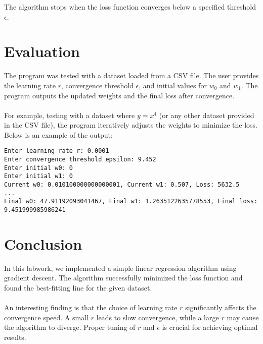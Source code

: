 \documentclass{article}
\begin{document}
The algorithm stops when the loss function converges below a specified threshold $\epsilon$.

\section{Evaluation}

The program was tested with a dataset loaded from a CSV file. The user provides the learning rate $r$, 
convergence threshold $\epsilon$, and initial values for $w_0$ and $w_1$. The program outputs the 
updated weights and the final loss after convergence.\\
\\
For example, testing with a dataset where $y = x^4$ (or any other dataset provided in the CSV file), 
the program iteratively adjusts the weights to minimize the loss. Below is an example of the output:

\begin{verbatim}
Enter learning rate r: 0.0001
Enter convergence threshold epsilon: 9.452
Enter initial w0: 0
Enter initial w1: 0
Current w0: 0.010100000000000001, Current w1: 0.507, Loss: 5632.5
...
Final w0: 47.91192093041467, Final w1: 1.2635122635778553, Final loss: 9.451999985986241
\end{verbatim}

\section{Conclusion}

In this labwork, we implemented a simple linear regression algorithm using gradient descent. The algorithm 
successfully minimized the loss function and found the best-fitting line for the given dataset.\\
\\
An interesting finding is that the choice of learning rate $r$ significantly affects the convergence speed. 
A small $r$ leads to slow convergence, while a large $r$ may cause the algorithm to diverge. Proper tuning 
of $r$ and $\epsilon$ is crucial for achieving optimal results.
\end{document}
